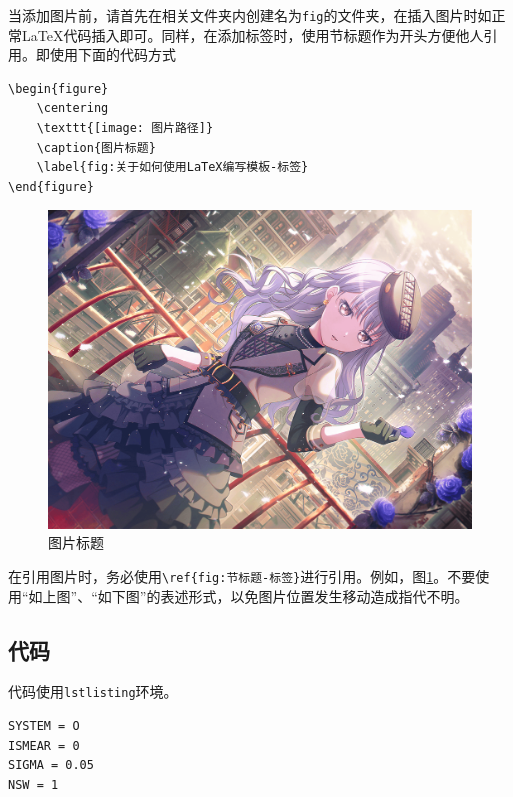 当添加图片前，请首先在相关文件夹内创建名为\verb|fig|的文件夹，在插入图片时如正常\LaTeX 代码插入即可。同样，在添加标签时，使用节标题作为开头方便他人引用。即使用下面的代码方式

\begin{lstlisting}[frame=line]
\begin{figure}
    \centering
    \texttt{[image: 图片路径]}
    \caption{图片标题}
    \label{fig:关于如何使用LaTeX编写模板-标签}
\end{figure}
\end{lstlisting}

\begin{figure}
    \centering
    \includegraphics[width=1\linewidth]{fig.png}
    \caption{图片标题}
    \label{fig:关于如何使用LaTeX编写模板-标签}
\end{figure}

\begin{attention}
    在引用图片时，务必使用\verb|\ref{fig:节标题-标签}|进行引用。例如，图\ref{fig:关于如何使用LaTeX编写模板-标签}。不要使用“如上图”、“如下图”的表述形式，以免图片位置发生移动造成指代不明。
\end{attention}

\subsection{代码}\label{subsec:关于如何使用LaTeX编写模板-代码}

代码使用\verb|lstlisting|环境。

\begin{lstlisting}
SYSTEM = O
ISMEAR = 0
SIGMA = 0.05
NSW = 1
\end{lstlisting}

